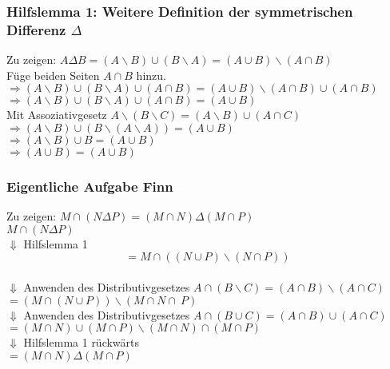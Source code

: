 \documentclass{article}
\begin{document}
            \subsubsection*{Hilfslemma 1: Weitere Definition der symmetrischen Differenz \( \Delta \)}
                Zu zeigen: \(A \Delta B = (A \backslash B) \cup (B \backslash A) = (A \cup B) \backslash (A \cap B) \) \\
                Füge beiden Seiten \( A \cap B \) hinzu. \\
                \(\Rightarrow (A \backslash B ) \cup ( B \backslash A ) \cup ( A \cap B ) = ( A \cup B ) \backslash ( A \cap B ) \cup ( A \cap B ) \) \\
                \(\Rightarrow (A \backslash B ) \cup ( B \backslash A ) \cup ( A \cap B ) = (A \cup B) \) \\
                Mit Assoziativgesetz \(A \backslash (B \backslash C) = (A \backslash B) \cup (A \cap C) \) \\
                \(\Rightarrow (A \backslash B ) \cup ( B \backslash (A \backslash A) ) = (A \cup B) \) \\
                \(\Rightarrow (A \backslash B ) \cup B = (A \cup B) \) \\
                \(\Rightarrow ( A \cup B ) = (A \cup B) \) \\

            \subsubsection*{Eigentliche Aufgabe Finn}
                Zu zeigen: \(M \cap (N \Delta P) = (M \cap N) \Delta (M \cap P) \) \\
                \(M \cap (N \Delta P)\) \\
                \indent \(\Downarrow \) Hilfslemma 1 \\
                \[= M \cap ((N \cup P) \backslash (N \cap P))\] \\
                \indent \(\Downarrow \) Anwenden des Distributivgesetzes \(A \cap (B \backslash C) = (A \cap B ) \backslash (A \cap C)\) \\
                \(= (M \cap (N \cup P)) \backslash (M \cap N \cap \ P)\) \\
                \indent \(\Downarrow \) Anwenden des Distributivgesetzes \(A \cap (B \cup C) = (A \cap B ) \cup (A \cap C)\) \\
                \(=(M \cap N) \cup (M \cap P) \backslash (M \cap N) \cap (M \cap P)\) \\
                \indent \(\Downarrow \) Hilfslemma 1 rückwärts\\
                \(=(M \cap N) \Delta (M \cap P)\) \\
                
\end{document}
